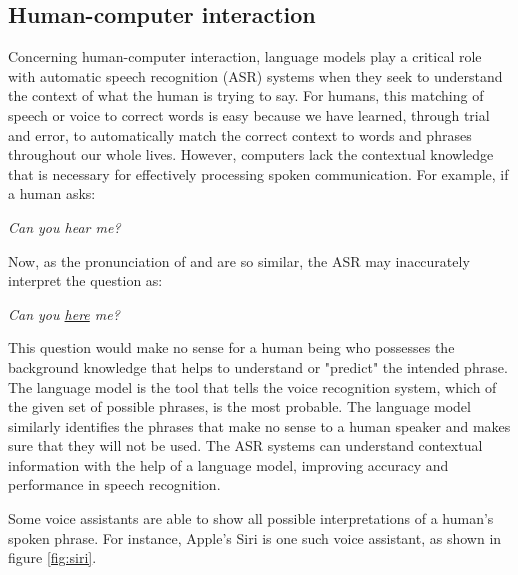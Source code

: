 \subsection{Human-computer interaction}

Concerning human-computer interaction, language models play a critical role with automatic speech recognition (ASR) systems when they seek to understand the context of what the human is trying to say. For humans, this matching of speech or voice to correct words is easy because we have learned, through trial and error, to automatically match the correct context to words and phrases throughout our whole lives. However, computers lack the contextual knowledge that is necessary for effectively processing spoken communication. For example, if a human asks:

\begin{displayquote}
\emph{Can you hear me?}
\end{displayquote}

Now, as the pronunciation of  and  are so similar, the ASR may inaccurately interpret the question as:

\begin{displayquote}
\emph{Can you \underline{here} me?}
\end{displayquote}

This question would make no sense for a human being who possesses the background knowledge that helps to understand or "predict" the intended phrase. The language model is the tool that tells the voice recognition system, which of the given set of possible phrases, is the most probable. The language model similarly identifies the phrases that make no sense to a human speaker and makes sure that they will not be used. The ASR systems can understand contextual information with the help of a language model, improving accuracy and performance in speech recognition.

Some voice assistants are able to show all possible interpretations of a human's spoken phrase. For instance, Apple's Siri is one such voice assistant, as shown in figure \ref{fig:siri}.


